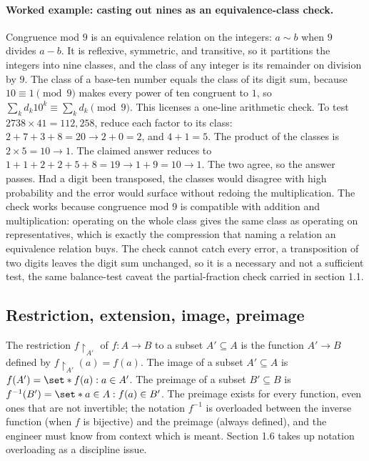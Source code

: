 \paragraph{Worked example: casting out nines as an equivalence-class
check.} Congruence mod $9$ is an equivalence relation on the integers:
$a \sim b$ when $9$ divides $a - b$. It is reflexive, symmetric, and
transitive, so it partitions the integers into nine classes, and the
class of any integer is its remainder on division by $9$. The class of a
base-ten number equals the class of its digit sum, because $10 \equiv 1
\pmod 9$ makes every power of ten congruent to $1$, so $\sum_{k} d_{k}
10^{k} \equiv \sum_{k} d_{k} \pmod 9$. This licenses a one-line
arithmetic check. To test $2738 \times 41 = 112{,}258$, reduce each
factor to its class: $2 + 7 + 3 + 8 = 20 \to 2 + 0 = 2$, and $4 + 1 =
5$. The product of the classes is $2 \times 5 = 10 \to 1$. The claimed
answer reduces to $1 + 1 + 2 + 2 + 5 + 8 = 19 \to 1 + 9 = 10 \to 1$. The
two agree, so the answer passes. Had a digit been transposed, the classes
would disagree with high probability and the error would surface without
redoing the multiplication. The check works because congruence mod $9$ is
compatible with addition and multiplication: operating on the whole class
gives the same class as operating on representatives, which is exactly
the compression that naming a relation an equivalence relation buys. The
check cannot catch every error, a transposition of two digits leaves the
digit sum unchanged, so it is a necessary and not a sufficient test, the
same balance-test caveat the partial-fraction check carried in section
1.1.

\subsection{Restriction, extension, image, preimage}

The restriction $f \restriction_{A'}$ of $f : A \to B$ to a subset
$A' \subseteq A$ is the function $A' \to B$ defined by
$f \restriction_{A'}(a) = f(a)$. The image of a subset $A' \subseteq
A$ is $f(A') = \set*{f(a) : a \in A'}$. The preimage of a subset
$B' \subseteq B$ is $f^{-1}(B') = \set*{a \in A : f(a) \in B'}$.
The preimage exists for every function, even ones that are not
invertible; the notation $f^{-1}$ is overloaded between the inverse
function (when $f$ is bijective) and the preimage (always defined),
and the engineer must know from context which is meant. Section 1.6
takes up notation overloading as a discipline issue.

